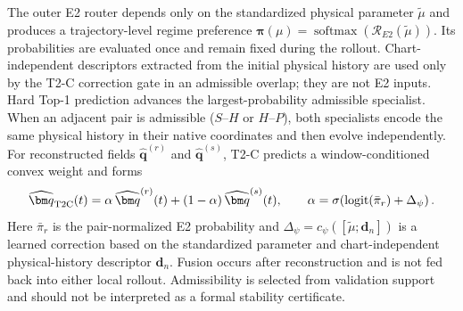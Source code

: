 The outer E2 router depends only on the standardized physical parameter $\widetilde\mu$ and produces a trajectory-level regime preference $\bm\pi(\mu)=\operatorname{softmax}(\mathcal R_{E2}(\widetilde\mu))$. Its probabilities are evaluated once and remain fixed during the rollout. Chart-independent descriptors extracted from the initial physical history are used only by the T2-C correction gate in an admissible overlap; they are not E2 inputs. Hard Top-1 prediction advances the largest-probability admissible specialist. When an adjacent pair is admissible ($S$--$H$ or $H$--$P$), both specialists encode the same physical history in their native coordinates and then evolve independently. For reconstructed fields $\widehat{\bm q}^{(r)}$ and $\widehat{\bm q}^{(s)}$, T2-C predicts a window-conditioned convex weight and forms
\begin{equation}
  \widehat{\bm q}_{\rm T2C}(t)
  =\alpha\,\widehat{\bm q}^{(r)}(t)+(1-\alpha)\,\widehat{\bm q}^{(s)}(t),
  \qquad \alpha=\sigma\!\left(\operatorname{logit}(\bar\pi_r)+\Delta_\psi\right).
  \label{eq:main_t2c}
\end{equation}
Here $\bar\pi_r$ is the pair-normalized E2 probability and $\Delta_\psi=c_\psi([\widetilde\mu;\bm d_n])$ is a learned correction based on the standardized parameter and chart-independent physical-history descriptor $\bm d_n$. Fusion occurs after reconstruction and is not fed back into either local rollout. Admissibility is selected from validation support and should not be interpreted as a formal stability certificate.
